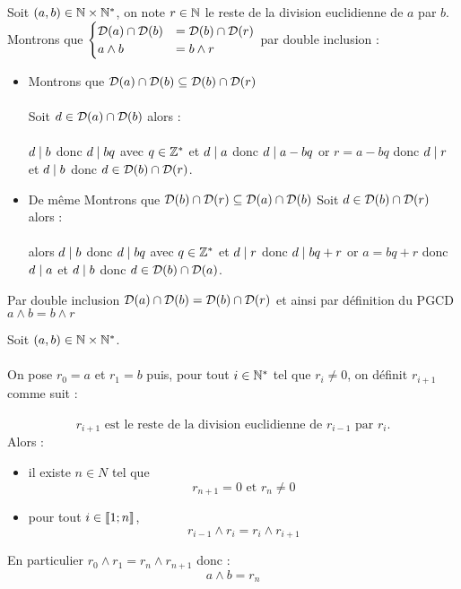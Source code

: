 \begin{dem}
    Soit \((a, b) \in \mathbb{N} \times \mathbb{N}^*\), on note \(r \in \mathbb{N}\) le reste de la division euclidienne de \(a\) par \(b\).
    Montrons que \(\begin{cases}
        \mathcal{D}(a) \cap \mathcal{D}(b) &= \mathcal{D}(b) \cap \mathcal{D}(r) \\
        a\wedge b                            &= b\wedge r
    \end{cases}\) par double inclusion :
    \begin{itemize}
        \item Montrons que \(\mathcal{D}(a) \cap \mathcal{D}(b) \subseteq \mathcal{D}(b) \cap \mathcal{D}(r)\)\\~\\
            Soit \(d \in \mathcal{D}(a) \cap \mathcal{D}(b)\) alors : \\~\\
            \(d \mid b\) donc \(d \mid bq\) avec \(q \in \mathbb{Z}^*\) et \(d \mid a\) donc \(d \mid a-bq\) or \(r = a-bq\) donc \(d \mid r\) et \(d \mid b\) donc \(d \in \mathcal{D}(b) \cap \mathcal{D}(r)\).
        \item De même Montrons que \(  \mathcal{D}(b) \cap \mathcal{D}(r) \subseteq \mathcal{D}(a) \cap \mathcal{D}(b)\)
         Soit \(d \in \mathcal{D}(b) \cap \mathcal{D}(r)\) alors :\\~\\
         alors \(d \mid b\) donc \(d \mid bq\) avec \(q \in \mathbb{Z}^*\) et \(d \mid r\) donc \(d \mid bq+r\) or \(a = bq+r\) donc \(d \mid a\) et \(d \mid b\) donc \(d \in \mathcal{D}(b) \cap \mathcal{D}(a)\).
        
    \end{itemize}
    \conclusion Par double inclusion \(\mathcal{D}(a) \cap \mathcal{D}(b) = \mathcal{D}(b) \cap \mathcal{D}(r)\) et ainsi par définition du PGCD \(a\wedge b = b\wedge r\)
\end{dem}

\begin{defprop}
    Soit \((a, b) \in \mathbb{N} \times \mathbb{N}^*\).\\~\\
    On pose \(r_0 = a\) et \(r_1 = b\) puis, pour tout \(i \in \mathbb{N}^*\) tel que \(r_i \neq 0\), on définit \(r_{i+1}\) comme suit :\\~\\
    \[r_{i+1}\text{ est le reste de la division euclidienne de } r_{i-1}\text{ par }r_i.\]
    Alors :
    \begin{itemize}
        \item il existe \(n \in N\) tel que
    \[r_{n+1} = 0\text{ et }r_n \neq 0\]
        \item pour tout \(i \in \left\llbracket1;n\right\rrbracket \),
    \[r_{i-1} \wedge r_i = r_i \wedge r_{i+1}\]
    \end{itemize}
    En particulier \(r_0 \wedge r_1 = r_n \wedge r_{n+1}\) donc :
    \[a \wedge b = r_n\]
\end{defprop}

